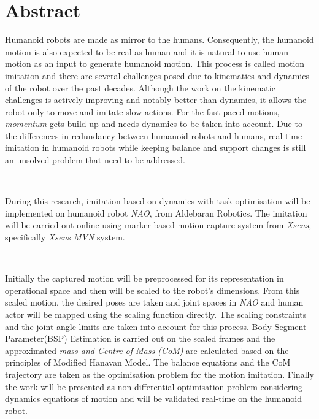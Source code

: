 \documentclass{thesisreport}
\begin{document}
   
 
  \section*{Abstract}
   
  Humanoid robots are made as mirror to the humans. Consequently, the humanoid motion is also expected to be real as 
  human and it is natural to use human motion as an input to generate humanoid motion. This process is called motion 
  imitation and there are several challenges posed due to kinematics and dynamics of the robot over the past decades. 
  Although the work on the kinematic challenges is actively improving and notably better than dynamics, it allows the 
  robot only to move and imitate slow actions. For the fast paced motions, \textit{momentum} gets build up and needs 
  dynamics to be taken into account. Due to the differences in redundancy between humanoid robots and humans, real-time 
  imitation in humanoid robots while keeping balance and support changes is still an unsolved problem that need to be 
  addressed.

  ~
  
  During this research, imitation based on dynamics with task optimisation will be implemented on humanoid robot 
  \textit{NAO}, from Aldebaran Robotics. The imitation will be carried out online using marker-based motion capture
   system from \textit{Xsens}, specifically \textit{Xsens MVN} system.
  
  ~
  
  Initially the captured motion will be preprocessed for its representation in operational space and then will be 
  scaled to the robot's dimensions. From this scaled motion, the desired poses are taken and joint spaces in 
  \textit{NAO} and human actor will be mapped using the scaling function directly. The scaling constraints and the 
  joint angle limits are taken into account for this process. Body Segment Parameter(BSP) Estimation is carried out 
  on the scaled frames and the approximated \textit{mass and Centre of Mass (CoM)} are calculated based on the 
  principles of Modified Hanavan Model. The balance equations and the CoM trajectory are taken as the optimisation 
  problem for the motion imitation. Finally the work will be presented as non-differential optimisation problem 
  considering dynamics equations of motion and will be validated real-time on the humanoid robot.
 
 
 \newpage
 
\end{document}
